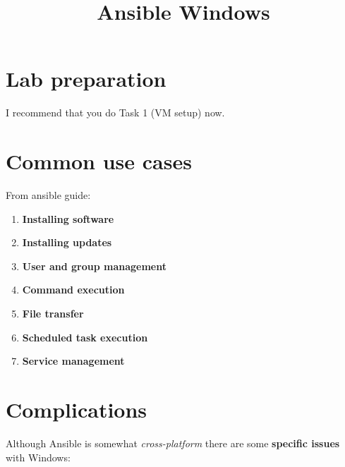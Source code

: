 \documentclass[slides]{pgnotes}
\title{Ansible Windows}
\begin{document}
\maketitle

\tableofcontents

\section{Lab preparation}

I recommend that you do Task 1 (VM setup) now.


\section{Common use cases}

From ansible guide: 

\begin{enumerate}

\item \textbf{Installing software}

\item \textbf{Installing updates}

\item \textbf{User and group management}

\item \textbf{Command execution}

\item \textbf{File transfer}

\item \textbf{Scheduled task execution}

\item \textbf{Service management}

\end{enumerate}

\section{Complications}

Although Ansible is somewhat \textit{cross-platform} there are some \textbf{specific issues} with Windows:
\end{document}
